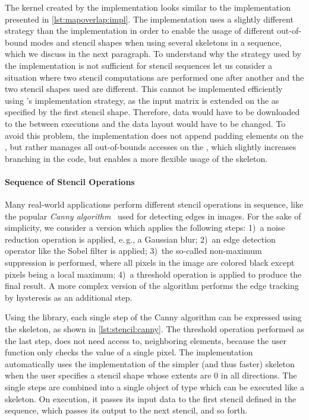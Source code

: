 The \OpenCL kernel created by the  implementation looks similar to the  implementation presented in \autoref{lst:mapoverlap:impl}.
The  implementation uses a slightly different strategy than the  implementation in order to enable the usage of different out-of-bound modes and stencil shapes when using several \stencil skeletons in a sequence, which we discuss in the next paragraph.
To understand why the strategy used by the  implementation is not sufficient for stencil sequences let us consider a situation where two stencil computations are performed one after another and the two stencil shapes used are different.
This cannot be implemented efficiently using 's implementation strategy, as the input matrix is extended on the \CPU as specified by the first stencil shape.
Therefore, data would have to be downloaded to the \CPU between executions and the data layout would have to be changed.
To avoid this problem, the  implementation does not append padding elements on the \CPU, but rather manages all out-of-bounds accesses on the \GPU, which slightly increases branching in the code, but enables a more flexible usage of the skeleton.


\paragraph{Sequence of Stencil Operations}
Many real-world applications perform different stencil operations in sequence, like the popular \emph{Canny algorithm}~\cite{NixonAg2012} used for detecting edges in images.
For the sake of simplicity, we consider a version which applies the following steps:
1)~a noise reduction operation is applied, e.\,g., a Gaussian blur;
2)~an edge detection operator like the Sobel filter is applied;
3)~the so-called non-maximum suppression is performed, where all pixels in the image are colored black except pixels being a local maximum;
4)~a threshold operation is applied to produce the final result.
A more complex version of the algorithm performs the edge tracking by hysteresis as an additional step.

Using the \SkelCL library, each single step of the Canny algorithm can be expressed using the \stencil skeleton, as shown in \autoref{lst:stencil:canny}.
The threshold operation performed as the last step, does not need access to, neighboring elements, because the user function only checks the value of a single pixel.
The  implementation automatically uses the implementation of the simpler (and thus faster) \map skeleton when the user specifies a stencil shape whose extents are $0$ in all directions.
The single steps are combined into a single object of type  which can be executed like a \stencil skeleton.
On execution, it passes its input data to the first stencil defined in the sequence, which passes its output to the next stencil, and so forth.

